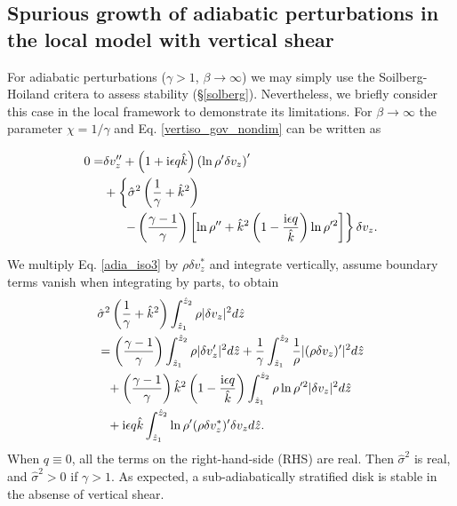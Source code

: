 \subsection{Spurious growth of adiabatic perturbations in the local
  model with vertical shear}\label{analytic_adia} 
For adiabatic perturbations ($\gamma>1$, $\beta\to\infty$) we may
simply use the Soilberg-Hoiland critera to assess stability
(\S\ref{solberg}). Nevertheless, we briefly consider this case in the
local framework to demonstrate its limitations. For $\beta\to\infty$
the parameter $\chi = 1/\gamma$ and Eq. \ref{vertiso_gov_nondim} can
be written as   

\begin{align}
  0 =& \delta v_z^{\prime\prime} + \left(1 + \mathrm{i} \epsilon q
    \hat{k}\right)\left(\ln\rho^{\prime}\delta v_z\right)^\prime\notag\\
  &+\left\{\hat{\sigma}^2\left(\frac{1}{\gamma}+\hat{k}^2\right)\right.\notag\\
  &\phantom{0=}\left.-\left(\frac{\gamma-1}{\gamma}\right)\left[\ln\rho^{\prime\prime}+\hat{k}^2\left(1-\frac{\mathrm{i}\epsilon  
          q}{\hat{k}}\right)\ln\rho^{\prime 2}\right]\right\}\delta v_z.\label{adia_iso3}
\end{align}

We multiply Eq. \ref{adia_iso3} by $\rho\delta v_z^*$ and
integrate vertically, assume boundary terms vanish when integrating by
parts, to obtain
\begin{align}
  &\hat{\sigma}^2\left(\frac{1}{\gamma} +
    \hat{k}^2\right)\int_{\hat{z}_1}^{\hat{z}_2}\rho|\delta
  v_z|^2 d\hat{z} \notag\\
  &=  \left(\frac{\gamma-1}{\gamma}\right)
  \int_{\hat{z}_1}^{\hat{z}_2}\rho|\delta v_z^\prime|^2 d\hat{z}
  +\frac{1}{\gamma}\int_{\hat{z}_1}^{\hat{z}_2}\frac{1}{\rho}|(\rho\delta
  v_z)^\prime|^2 d\hat{z}\notag\\
  &\phantom{=} +
  \left(\frac{\gamma-1}{\gamma}\right)\hat{k}^2\left(1-\frac{\mathrm{i}\epsilon
      q}{\hat{k}}\right) \int_{\hat{z}_1}^{\hat{z}_2}\rho\ln\rho^{\prime
    2}|\delta v_z|^2 d\hat{z}\notag\\
  &\phantom{=} + \mathrm{i}\epsilon q \hat{k}
  \int_{\hat{z}_1}^{\hat{z}_2}\ln\rho^\prime(\rho\delta v_z^*)^\prime
  \delta v_z d\hat{z}.\label{adia_integral}
\end{align}
When $q\equiv0$, all the terms on the right-hand-side (RHS) are real. Then
$\hat{\sigma}^2$ is real, and  $\hat{\sigma}^2>0$ if $\gamma>1$. As
expected, a sub-adiabatically stratified disk is stable in the absense
of vertical shear. 

